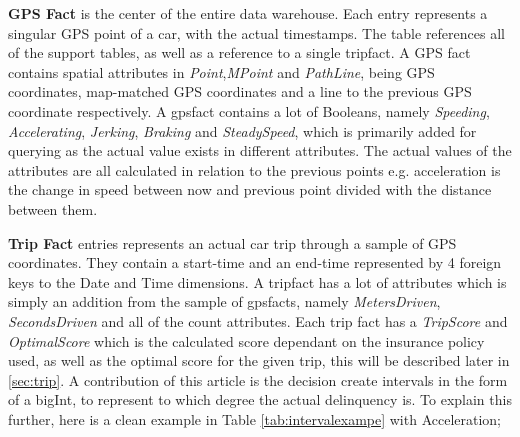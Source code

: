 \textbf{GPS Fact} is the center of the entire data warehouse. Each entry represents a singular GPS point of a car, with the actual timestamps. The table references all of the support tables, as well as a reference to a single tripfact. A GPS fact contains spatial attributes in \textit{Point},\textit{MPoint} and \textit{PathLine}, being GPS coordinates, map-matched GPS coordinates and a line to the previous GPS coordinate respectively. A gpsfact contains a lot of Booleans, namely \textit{Speeding}, \textit{Accelerating}, \textit{Jerking}, \textit{Braking} and \textit{SteadySpeed}, which is primarily added for querying as the actual value exists in different attributes. The actual values of the attributes are all calculated in relation to the previous points e.g. acceleration is the change in speed between now and previous point divided with the distance between them.

\textbf{Trip Fact} entries represents an actual car trip through a sample of GPS coordinates. They contain a start-time and an end-time represented by 4 foreign keys to the Date and Time dimensions. A tripfact has a lot of attributes which is simply an addition from the sample of gpsfacts, namely \textit{MetersDriven}, \textit{SecondsDriven} and all of the count attributes. Each trip fact has a \textit{TripScore} and \textit{OptimalScore} which is the calculated score dependant on the insurance policy used, as well as the optimal score for the given trip, this will be described later in \ref{sec:trip}. A contribution of this article is the decision create intervals in the form of a bigInt, to represent to which degree the actual delinquency is. To explain this further, here is a clean example in Table \ref{tab:intervalexampe} with Acceleration; 


